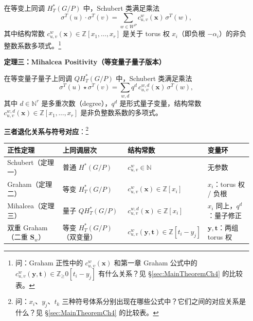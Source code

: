\begin{Theorem}
\label{th:GrahamPositivityCh4}
在等变上同调 $H_T^*(G/P)$ 中，Schubert 类满足乘法
\begin{equation}
\label{eq:GrahamProduct}
\sigma^T(u) \cdot \sigma^T(v) = \sum_{w \in W^P} c_{u,v}^w(\mathbf{x}) \, \sigma^T(w),
\end{equation}
其中结构常数 $c_{u,v}^w(\mathbf{x}) \in \mathbb{Z}[x_1,\ldots,x_r]$ 是关于 torus 权 $x_i$（即负根 $-\alpha_i$）的非负整数系数多项式。\footnote{问：Graham 正性中的 $c_{u,v}^w(\mathbf{x})$ 和第一章 Graham 公式中的 $c^w_{u,v}(\mathbf{y},\mathbf{t}) \in \mathbb{Z}_\geq0[t_i - y_j]$ 有什么关系？见 \S\ref{sec:MainTheoremCh4} 的比较表。}
\end{Theorem}

\smallskip
\noindent\textbf{定理三：Mihalcea Positivity（等变量子量子版本）}

\begin{Theorem}
\label{th:MihalceaPositivityCh4}
在等变量子量子上同调 $QH_T^*(G/P)$ 中，Schubert 类满足乘法
\begin{equation}
\label{eq:MihalceaProduct}
\sigma^T(u) \star \sigma^T(v) = \sum_{w,d} q^d \, c_{u,v}^{w,d}(\mathbf{x}) \, \sigma^T(w),
\end{equation}
其中 $d \in \mathbb{N}^r$ 是多重次数（degree），$q^d$ 是形式量子变量，结构常数 $c_{u,v}^{w,d}(\mathbf{x}) \in \mathbb{Z}[x_1,\ldots,x_r]$ 是非负整数系数的多项式。
\end{Theorem}

\smallskip
\noindent\textbf{三者退化关系与符号对应}：\footnote{问：$x_i$、$y_j$、$t_k$ 三种符号体系分别出现在哪些公式中？它们之间的对应关系是什么？见 \S\ref{sec:MainTheoremCh4} 的比较表。}

\begin{center}
\begin{tabular}{p{2.5cm}|p{3cm}|p{4cm}|p{4.5cm}}
\hline
\textbf{正性定理} & \textbf{上同调层次} & \textbf{结构常数} & \textbf{变量环} \\ \hline
Schubert（定理一） & 普通 $H^*(G/P)$ & $c_{u,v}^w \in \mathbb{N}$ & 无参数 \\ \hline
Graham（定理二） & 等变 $H_T^*(G/P)$ & $c_{u,v}^w(\mathbf{x}) \in \mathbb{Z}[x_i]$ & $x_i$：torus 权 / 负根 \\ \hline
Mihalcea（定理三） & 量子 $QH_T^*(G/P)$ & $c_{u,v}^{w,d}(\mathbf{x}) \in \mathbb{Z}[x_i]$ & $x_i$ 同上，$q^d$：量子修正 \\ \hline
双重 Graham（二重 $\mathbf{S}_w$） & 等变 $H_T^*(G/P)$（双变量） & $c_{u,v}^w(\mathbf{y},\mathbf{t}) \in \mathbb{Z}[t_i - y_j]$ & $\mathbf{y}, \mathbf{t}$：两组 torus 权 \\ \hline
\end{tabular}
\end{center}

